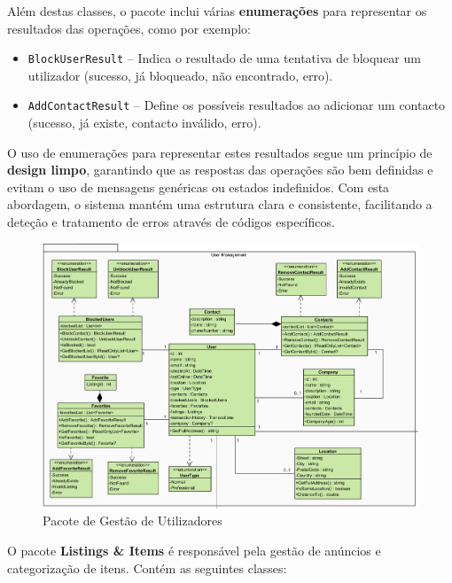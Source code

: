 \documentclass[a4paper, 12pt]{article} %
\begin{document}
Além destas classes, o pacote inclui várias \textbf{enumerações} para representar os resultados das operações, como por exemplo:

\begin{itemize}
	\item \texttt{BlockUserResult} – Indica o resultado de uma tentativa de bloquear um utilizador (sucesso, já bloqueado, não encontrado, erro).
	\item \texttt{AddContactResult} – Define os possíveis resultados ao adicionar um contacto (sucesso, já existe, contacto inválido, erro).
\end{itemize}

O uso de enumerações para representar estes resultados segue um princípio de \textbf{design limpo}, garantindo que as respostas das operações são bem definidas e evitam o uso de mensagens genéricas ou estados indefinidos. Com esta abordagem, o sistema mantém uma estrutura clara e consistente, facilitando a deteção e tratamento de erros através de códigos específicos.

\begin{figure}[ht]
	\centering
	\includegraphics[width=\textwidth]{diagrama_classes_gestao_utilizadores.png}
	\caption{Pacote de Gestão de Utilizadores}
	\label{fig:diagrama_classes_gestao_utilizadores}
\end{figure}



O pacote \textbf{Listings \& Items} é responsável pela gestão de anúncios e categorização de itens. Contém as seguintes classes:
\end{document}
